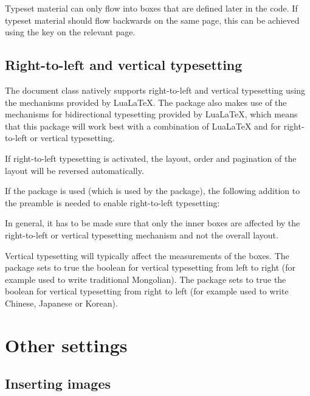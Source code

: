 \documentclass[a4paper]{article}
\begin{document}
Typeset material can only flow into boxes that are defined later in the code. If typeset material should flow backwards on the same page, this can be achieved using the key  on the relevant page.

\subsection{Right-to-left and vertical typesetting}

The document class natively supports right-to-left and vertical typesetting using the mechanisms provided by LuaLaTeX. The  package also makes use of the mechanisms for bidirectional typesetting provided by LuaLaTeX, which means that this package will work best with a combination of LuaLaTeX and  for right-to-left or vertical typesetting.

If right-to-left typesetting is activated, the layout, order and pagination of the layout will be reversed automatically.

If the  package is used (which is used by the  package), the following addition to the preamble is needed to enable right-to-left typesetting:

\begin{codeexample}
\end{codeexample}

In general, it has to be made sure that only the inner boxes are affected by the right-to-left or vertical typesetting mechanism and not the overall layout.

Vertical typesetting will typically affect the measurements of the boxes. The package sets to true the boolean  for vertical typesetting from left to right (for example used to write traditional Mongolian). The package sets to true the boolean  for vertical typesetting from right to left (for example used to write Chinese, Japanese or Korean).

\section{Other settings}

\subsection{Inserting images}
\end{document}
